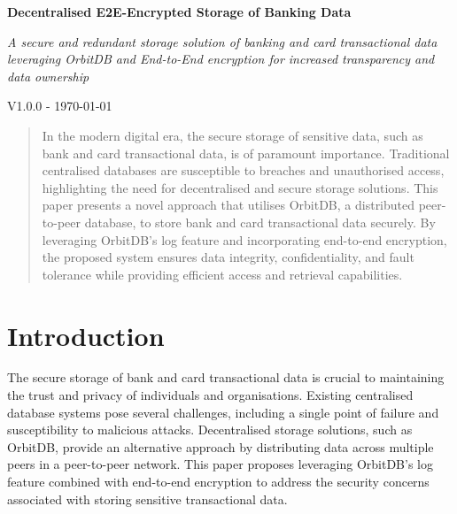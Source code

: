 \documentclass[a4paper,11 pt]{article}
\theoremstyle{definition}
\begin{document}
\begin{titlepage}
    \begin{center}
        \vspace*{1cm}
            
        \Large
        \textbf{ Decentralised E2E-Encrypted Storage of Banking Data}

        \vspace{1cm}
        \Large
        {\it A secure and redundant storage solution of banking and card transactional data leveraging OrbitDB and End-to-End encryption for increased transparency and data ownership}

        \vspace{1.5cm}
        {\normalsize V1.0.0 - \today}
        \vspace{1.0cm}

        \begin{abstract}        
        In the modern digital era, the secure storage of sensitive data, such as bank and card transactional data, is of paramount importance. Traditional centralised databases are susceptible to breaches and unauthorised access, highlighting the need for decentralised and secure storage solutions. This paper presents a novel approach that utilises OrbitDB, a distributed peer-to-peer database, to store bank and card transactional data securely. By leveraging OrbitDB's log feature and incorporating end-to-end encryption, the proposed system ensures data integrity, confidentiality, and fault tolerance while providing efficient access and retrieval capabilities.       
        \end{abstract}
            
    \end{center}
\tableofcontents
\end{titlepage}

\section{Introduction}
The secure storage of bank and card transactional data is crucial to maintaining the trust and privacy of individuals and organisations. Existing centralised database systems pose several challenges, including a single point of failure and susceptibility to malicious attacks. Decentralised storage solutions, such as OrbitDB, provide an alternative approach by distributing data across multiple peers in a peer-to-peer network. This paper proposes leveraging OrbitDB's log feature combined with end-to-end encryption to address the security concerns associated with storing sensitive transactional data.
\end{document}

